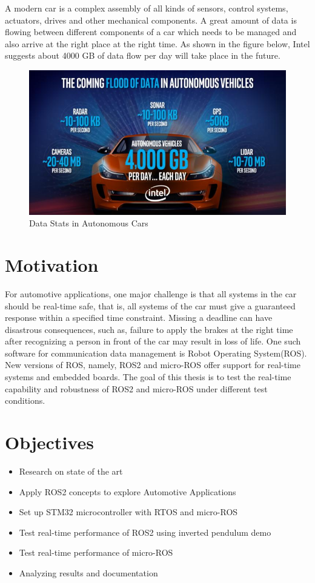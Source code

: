 \documentclass[%
xelatex,
	oneside,		%
	12pt,			%
	parskip=half,	%
	abstracton,
	chapterprefix=true%
    appendixprefix=true]
{scrbook}
\begin{document}
A modern car is a complex assembly of all kinds of sensors, control systems, actuators, drives and other mechanical components. A great amount of data is flowing between different components of a car which needs to be managed and also arrive at the right place at the right time. As shown in the figure below, Intel suggests about 4000 GB of data flow per day will take place in the future.
\begin{figure}[ht]
\begin{center}
\includegraphics[scale=.5]{fig/autonomous-vehicle-data-intel-100697604-large.jpg}
\caption[Data Stats in Autonomous Cars]{Data Stats in Autonomous Cars\cite{datastats}}
\label{fig:datastats}
\end{center}
\end{figure}  
  
     \section{Motivation}	
For automotive applications, one major challenge is that all systems in the car should be real-time safe, that is, all systems of the car must give a guaranteed response within a specified time constraint. Missing a deadline can have disastrous consequences, such as, failure to apply the brakes at the right time after recognizing a person in front of the car may result in loss of life. 
One such software for communication data management is Robot Operating System(ROS). New versions of ROS, namely, ROS2 and micro-ROS offer support for real-time systems and embedded boards. The goal of this thesis is to test the real-time capability and robustness of ROS2 and micro-ROS under different test conditions.
	 \section{Objectives}
\begin{itemize}
  \item Research on state of the art
  \item Apply ROS2 concepts to explore Automotive Applications
  \item Set up STM32 microcontroller with RTOS and micro-ROS
  \item Test real-time performance of ROS2 using inverted pendulum demo  
  \item Test real-time performance of micro-ROS
  \item Analyzing results and documentation
\end{itemize}
	 
\end{document}
